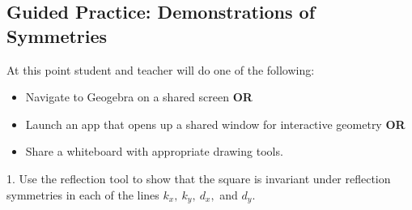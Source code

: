 \documentclass{tufte-handout}
\newcommand{\uv}{\vspace{.1in}}
\newcommand{\uvx}{\vspace{.2in}}
\begin{document}
\uvx
\begin{tcolorbox}[enhanced jigsaw,breakable,pad at break*=1mm,attach boxed title to top center={yshift=-3mm,yshifttext=-1mm},
  colback=yellow!50!white,colframe=yellow,colbacktitle=red!80!black,
  title=Lesson Design Specifications (Please Read),fonttitle=\bfseries,
  boxed title style={size=small,colframe=red!50!black} ]
  \section{Guided Practice: Demonstrations of Symmetries }
 At this point student and teacher will do one of the following: 
    \begin{itemize}
      \item Navigate to Geogebra on a shared screen \textbf{OR}
      \item Launch an app that opens up a shared window for interactive geometry \textbf{OR}
      \item Share a whiteboard with appropriate drawing tools.
  \end{itemize}
 \uv 1. Use the reflection tool to show that the square is invariant under reflection symmetries in each of the lines $k_x, \ k_y, \ d_x,$ and $d_y.$
 \begin{center}
 \end{center}
 

\end{tcolorbox}
\end{document}
